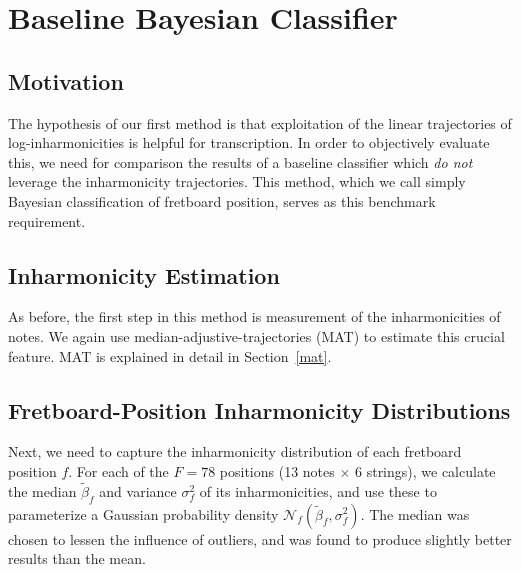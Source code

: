 \documentclass[12pt]{cmuthesis}
\begin{document}
\section{Baseline Bayesian Classifier}
\subsection{Motivation}
The hypothesis of our first method is that exploitation of the linear trajectories of log-inharmonicities is helpful for transcription. In order to objectively evaluate this, we need for comparison the results of a baseline classifier which \textit{do not} leverage the inharmonicity trajectories. This method, which we call simply Bayesian classification of fretboard position, serves as this benchmark requirement. 

\subsection{Inharmonicity Estimation}
As before, the first step in this method is measurement of the inharmonicities of notes. We again use median-adjustive-trajectories (MAT) to estimate this crucial feature. MAT is explained in detail in Section~\ref{mat}.

\subsection{Fretboard-Position Inharmonicity Distributions}
Next, we need to capture the inharmonicity distribution of each fretboard position $f$. For each of the $F=78$ positions (13 notes $\times$ 6 strings), we calculate the median $\tilde{\beta}_f$ and variance $\sigma^2_f$ of its inharmonicities, and use these to parameterize a Gaussian probability density $\mathcal{N}_f(\tilde{\beta}_f,\sigma^2_f)$. The median was chosen to lessen the influence of outliers, and was found to produce slightly better results than the mean.
\end{document}
